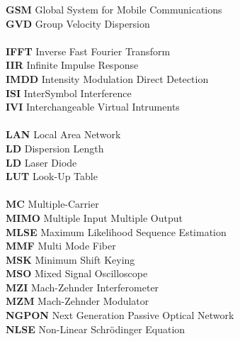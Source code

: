 \begin{multicols}{2}
\begin{tabbing}
\textbf{GSM}		\>	Global System for Mobile Communications			\\
\textbf{GVD}		\>	Group Velocity Dispersion						\\
\\
\textbf{IFFT}		\>	Inverse Fast Fourier Transform					\\
\textbf{IIR}		\>	Infinite Impulse Response						\\
\textbf{IMDD}		\>	Intensity Modulation Direct Detection			\\
\textbf{ISI}		\>	InterSymbol Interference						\\
\textbf{IVI}		\>	Interchangeable Virtual Intruments				\\
\\
\textbf{LAN}		\>	Local Area Network								\\
\textbf{LD}			\>	Dispersion Length								\\
\textbf{LD}			\>	Laser Diode										\\
\textbf{LUT}		\>	Look-Up Table									\\
\\
\textbf{MC}			\>	Multiple-Carrier								\\
\textbf{MIMO}		\>	Multiple Input Multiple Output					\\
\textbf{MLSE}		\>	Maximum Likelihood Sequence Estimation			\\
\textbf{MMF}		\>	Multi Mode Fiber								\\
\textbf{MSK}		\>	Minimum Shift Keying							\\
\textbf{MSO}		\>	Mixed Signal Oscilloscope						\\
\textbf{MZI}		\>	Mach-Zehnder Interferometer						\\
\textbf{MZM}		\>	Mach-Zehnder Modulator							\\
\textbf{NGPON}		\>	Next Generation Passive Optical Network			\\
\textbf{NLSE}		\>	Non-Linear Schr\"{o}dinger Equation				\\

\end{tabbing}
\end{multicols}

